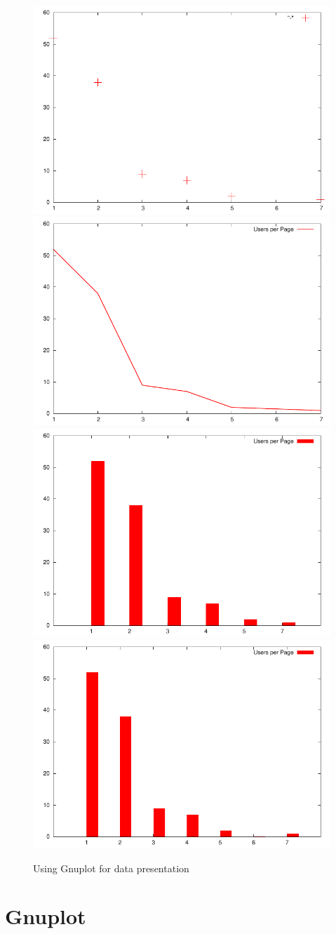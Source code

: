 \documentclass[a4paper]{scrartcl}
\begin{document}
\begin{figure}
  \includegraphics[width=.49\textwidth]{gp_hist_points}\hfill
  \includegraphics[width=.49\textwidth]{gp_hist_line}\\
  \includegraphics[width=.49\textwidth]{gp_hist_hist0}\hfill
  \includegraphics[width=.49\textwidth]{gp_hist_hist}
  \caption{Using Gnuplot for data presentation}
  \label{fig:gp_hist}
\end{figure}

\section{Gnuplot}
\label{sec:gnuplot}
\end{document}
